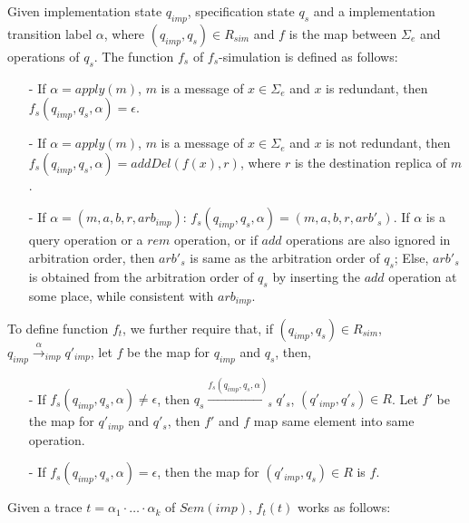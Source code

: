 Given implementation state $q_{\mathit{imp}}$, specification state $q_s$ and a implementation transition label $\alpha$, where $(q_{\mathit{imp}},q_s) \in R_{\mathit{sim}}$ and $f$ is the map between $\Sigma_e$ and operations of $q_s$. The function $f_s$ of $f_s$-simulation is defined as follows: 

\begin{itemize}
\setlength{\itemsep}{0.5pt}
\item[-] If $\alpha = apply(m)$, $m$ is a message of $x \in \Sigma_e$ and $x$ is redundant, then $f_s(q_{\mathit{imp}},q_s,\alpha) = \epsilon$. 

\item[-] If $\alpha = apply(m)$, $m$ is a message of $x \in \Sigma_e$ and $x$ is not redundant, then $f_s(q_{\mathit{imp}},q_s,\alpha) = addDel(f(x),r)$, where $r$ is the destination replica of $m$. 

\item[-] If $\alpha = (m,a,b,r,\mathit{arb}_{\mathit{imp}})$: $f_s(q_{\mathit{imp}},q_s,\alpha) = (m,a,b,r,\mathit{arb}'_s)$. If $\alpha$ is a query operation or a $\mathit{rem}$ operation, or if $add$ operations are also ignored in arbitration order, then $\mathit{arb}'_s$ is same as the arbitration order of $q_s$; Else, $\mathit{arb}'_s$ is obtained from the arbitration order of $q_s$ by inserting the $add$ operation at some place, while consistent with $\mathit{arb}_{\mathit{imp}}$.
\end{itemize} 

To define function $f_t$, we further require that, if $(q_{\mathit{imp}},q_s) \in R_{\mathit{sim}}$, $q_{\mathit{imp}} {\xrightarrow{\alpha}}_{\mathit{imp}} q'_{\mathit{imp}}$, let $f$ be the map for $q_{\mathit{imp}}$ and $q_s$, then, 

\begin{itemize}
\setlength{\itemsep}{0.5pt}
\item[-] If $f_s(q_{\mathit{imp}},q_s,\alpha) \neq \epsilon$, then $q_s {\xrightarrow{f_s(q_{\mathit{imp}},q_s,\alpha)}}_s q'_s$, $(q'_{\mathit{imp}},q'_s) \in R$. Let $f'$ be the map for $q'_{\mathit{imp}}$ and $q'_s$, then $f'$ and $f$ map same element into same operation. 

\item[-] If $f_s(q_{\mathit{imp}},q_s,\alpha) = \epsilon$, then the map for $(q'_{\mathit{imp}},q_s) \in R$ is $f$.  
\end{itemize}

Given a trace $t = \alpha_1 \cdot \ldots \cdot \alpha_k$ of $Sem(imp)$, $f_t(t)$ works as follows: 

